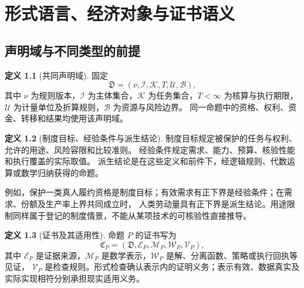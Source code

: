 \documentclass[UTF8,12pt,a4paper,openany,fontset=none,zihao=false]{ctexrep}
\theoremstyle{definition}
\newtheorem{definition}{定义}[chapter]
\newcommand{\1}{\mathbf 1}
\begin{document}
\clearpage
\tableofcontents
\clearpage
{}

\chapter{形式语言、经济对象与证书语义}
\label{base:chapter}

\section{声明域与不同类型的前提}

\begin{definition}[共同声明域]
固定
\[
\mathfrak D=(\nu,\mathcal I,\mathcal K,T,\mathcal U,\mathcal B),
\]
其中 \(\nu\) 为规则版本，\(\mathcal I\) 为主体集合，\(\mathcal K\) 为任务集合，\(T<\infty\) 为核算与执行期限，
\(\mathcal U\) 为计量单位及折算规则，\(\mathcal B\) 为资源与风险边界。
同一命题中的资格、权利、资金、转移和结果均使用该声明域。
\end{definition}

\begin{definition}[制度目标、经验条件与派生结论]
制度目标规定被保护的任务与权利、允许的用途、风险容限和比较准则。
经验条件规定需求、能力、预算、核验性能和执行覆盖的实际取值。
派生结论是在这些定义和前件下，经逻辑规则、代数运算或数学归纳获得的命题。
\end{definition}

例如，保护一类真人履约资格是制度目标；有效需求有正下界是经验条件；在需求、份额及生产率上界共同成立时，
人类劳动量具有正下界是派生结论。用途限制同样属于登记的制度情景，不能从某项技术的可核验性直接推导。

\begin{definition}[证书及其适用性]
命题 \(P\) 的证书写为
\[
\mathfrak C_P=(\mathfrak D,\mathcal E_P,\mathcal M_P,\mathcal W_P,\mathcal V_P),
\]
其中 \(\mathcal E_P\) 是证据来源，\(\mathcal M_P\) 是数学表示，\(\mathcal W_P\) 是解、分离函数、策略或执行回执等见证，
\(\mathcal V_P\) 是检查规则。形式检查确认表示内的证明义务；表示有效、数据真实及实际实现相符分别承担现实适用义务。
\end{definition}
\end{document}
